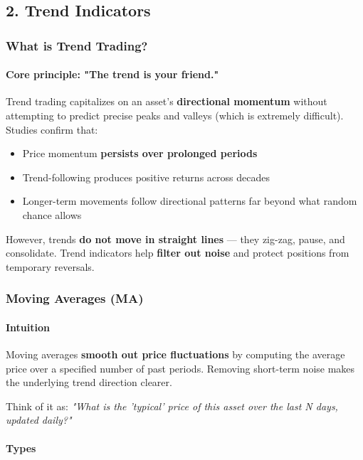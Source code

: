 \documentclass[12pt,openany]{book}
\begin{document}
\subsection{2. Trend Indicators}

\subsubsection{What is Trend Trading?}

\paragraph{Core principle: "The trend is your friend."}

Trend trading capitalizes on an asset's \textbf{directional momentum} without attempting to predict precise peaks and valleys (which is extremely difficult). Studies confirm that:
\begin{itemize}[leftmargin=*]
    \item Price momentum \textbf{persists over prolonged periods}
    \item Trend-following produces positive returns across decades
    \item Longer-term movements follow directional patterns far beyond what random chance allows
\end{itemize}

However, trends \textbf{do not move in straight lines} --- they zig-zag, pause, and consolidate. Trend indicators help \textbf{filter out noise} and protect positions from temporary reversals.

\subsubsection{Moving Averages (MA)}

\paragraph{Intuition}
Moving averages \textbf{smooth out price fluctuations} by computing the average price over a specified number of past periods. Removing short-term noise makes the underlying trend direction clearer.

Think of it as: \emph{"What is the 'typical' price of this asset over the last N days, updated daily?"}

\paragraph{Types}
\end{document}
